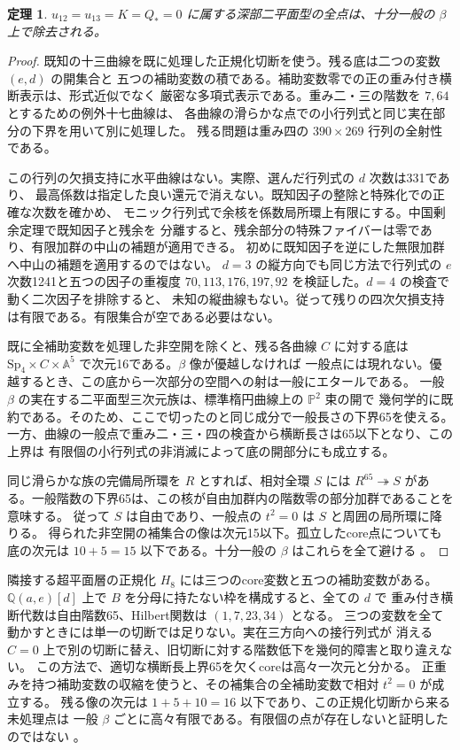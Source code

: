 \documentclass[11pt,a4paper]{ltjsarticle}
\newtheorem{theorem}{定理}[section]
\theoremstyle{remark}
\begin{document}
\begin{theorem}
$u_{12}=u_{13}=K=Q_*=0$ に属する深部二平面型の全点は、十分一般の $\beta$ 上で除去される。
\end{theorem}
\begin{proof}
既知の十三曲線を既に処理した正規化切断を使う。残る底は二つの変数 $(e,d)$ の開集合と
五つの補助変数の積である。補助変数零での正の重み付き横断表示は、形式近似でなく
厳密な多項式表示である。重み二・三の階数を $7,64$ とするための例外十七曲線は、
各曲線の滑らかな点での小行列式と同じ実在部分の下界を用いて別に処理した。
残る問題は重み四の $390\times269$ 行列の全射性である。

この行列の欠損支持に水平曲線はない。実際、選んだ行列式の $d$ 次数は331であり、
最高係数は指定した良い還元で消えない。既知因子の整除と特殊化での正確な次数を確かめ、
モニック行列式で余核を係数局所環上有限にする。中国剰余定理で既知因子と残余を
分離すると、残余部分の特殊ファイバーは零であり、有限加群の中山の補題が適用できる。
初めに既知因子を逆にした無限加群へ中山の補題を適用するのではない。
$d=3$ の縦方向でも同じ方法で行列式の $e$ 次数1241と五つの因子の重複度
$70,113,176,197,92$ を検証した。$d=4$ の検査で動く二次因子を排除すると、
未知の縦曲線もない。従って残りの四次欠損支持は有限である。有限集合が空である必要はない。

既に全補助変数を処理した非空開を除くと、残る各曲線 $C$ に対する底は
$\mathrm{Sp}_4\times C\times\mathbb A^5$ で次元16である。$\beta$ 像が優越しなければ
一般点には現れない。優越するとき、この底から一次部分の空間への射は一般にエタールである。
一般 $\beta$ の実在する二平面型三次元族は、標準楕円曲線上の $\mathbb P^2$ 束の開で
幾何学的に既約である。そのため、ここで切ったのと同じ成分で一般長さの下界65を使える。
一方、曲線の一般点で重み二・三・四の検査から横断長さは65以下となり、この上界は
有限個の小行列式の非消滅によって底の開部分にも成立する。

同じ滑らかな族の完備局所環を $R$ とすれば、相対全環 $S$ には $R^{65}\twoheadrightarrow S$
がある。一般階数の下界65は、この核が自由加群内の階数零の部分加群であることを意味する。
従って $S$ は自由であり、一般点の $t^2=0$ は $S$ と周囲の局所環に降りる。
得られた非空開の補集合の像は次元15以下。孤立したcore点についても底の次元は
$10+5=15$ 以下である。十分一般の $\beta$ はこれらを全て避ける
\cite{deep-full-v54,deep-horiz-v54,deep-vert-v54}。
\end{proof}

隣接する超平面層の正規化 $H_8$ には三つのcore変数と五つの補助変数がある。
$\mathbb Q(a,e)[d]$ 上で $B$ を分母に持たない枠を構成すると、全ての $d$ で
重み付き横断代数は自由階数65、Hilbert関数は $(1,7,23,34)$ となる。
三つの変数を全て動かすときには単一の切断では足りない。実在三方向への接行列式が
消える $C=0$ 上で別の切断に替え、旧切断に対する階数低下を幾何的障害と取り違えない。
この方法で、適切な横断長上界65を欠くcoreは高々一次元と分かる。
正重みを持つ補助変数の収縮を使うと、その補集合の全補助変数で相対 $t^2=0$ が成立する。
残る像の次元は $1+5+10=16$ 以下であり、この正規化切断から来る未処理点は
一般 $\beta$ ごとに高々有限である。有限個の点が存在しないと証明したのではない
\cite{hyper-codim-v54,hyper-horiz-v54}。
\end{document}
